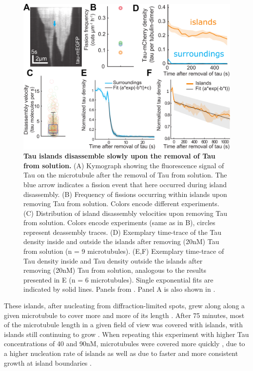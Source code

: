 \begin{figure}
	\centering
	\includegraphics[width=1\linewidth]{Figures/TauSHRINK.png}
	\caption[Tau islands disassemble slowly upon the removal of Tau from solution.]{
	\textbf{Tau islands disassemble slowly upon the removal of Tau from solution.} (A) Kymograph showing the fluorescence signal of Tau on the microtubule after the removal of Tau from solution. The blue arrow indicates a fission event that here occurred during island disassembly. (B) Frequency of fissions occurring within islands upon removing Tau from solution. Colors encode different experiments. (C) Distribution of island disassembly velocities upon removing Tau from solution. Colors encode experiments (same as in B), circles represent deassembly traces. (D) Exemplary time-trace of the Tau density inside and outside the islands after removing (20nM) Tau from solution (n = 9 microtubules). (E,F) Exemplary time-trace of Tau density inside and Tau density outside the islands after removing (20nM) Tau from solution, analogous to the results presented in E (n = 6 microtubules). Single exponential fits are indicated by solid lines. Panels from \cite{Siahaan2019a}. Panel A is also shown in \cite{Siahaan}.
		}\label{TauSHRINK}
\end{figure}
These islands, after nucleating from diffraction-limited spots, grew along along a given microtubule to cover more and more of its length . After 75 minutes, most of the microtubule length in a given field of view was covered with islands, with islands still continuing to grow . When repeating this experiment with higher Tau concentrations of 40 and 90nM, microtubules were covered more quickly , due to a higher nucleation rate of islands  as well as due to faster and more consistent growth at island boundaries . \par

